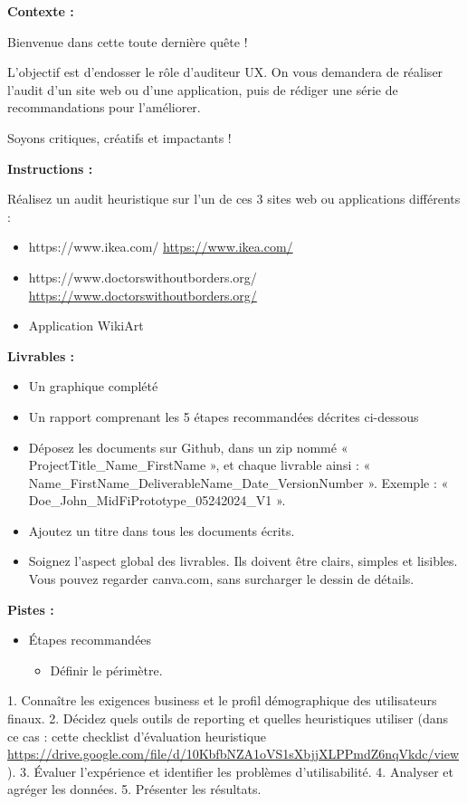 \makeheaderfiles

\textbf{Contexte :}

Bienvenue dans cette toute dernière quête !

L'objectif est d'endosser le rôle d'auditeur UX. On vous demandera de réaliser l'audit d'un site web ou d'une application, puis de rédiger une série de recommandations pour l'améliorer.

Soyons critiques, créatifs et impactants !

\textbf{Instructions :}

Réalisez un audit heuristique sur l'un de ces 3 sites web ou applications différents :

\begin{itemize}
\item https://www.ikea.com/ \url{https://www.ikea.com/}
\item https://www.doctorswithoutborders.org/ \url{https://www.doctorswithoutborders.org/}
\item Application WikiArt
\end{itemize}

\textbf{Livrables :}

\begin{itemize}
\item Un graphique complété
\item Un rapport comprenant les 5 étapes recommandées décrites ci-dessous
\item Déposez les documents sur Github, dans un zip nommé « ProjectTitle\_Name\_FirstName », et chaque livrable ainsi : « Name\_FirstName\_DeliverableName\_Date\_VersionNumber ». Exemple : « Doe\_John\_MidFiPrototype\_05242024\_V1 ».
\item Ajoutez un titre dans tous les documents écrits.
\item Soignez l'aspect global des livrables. Ils doivent être clairs, simples et lisibles. Vous pouvez regarder canva.com, sans surcharger le dessin de détails.
\end{itemize}

\textbf{Pistes :}

\begin{itemize}
\item Étapes recommandées
\begin{itemize}
\item Définir le périmètre.
\end{itemize}
\end{itemize}
1. Connaître les exigences business et le profil démographique des utilisateurs finaux.
2. Décidez quels outils de reporting et quelles heuristiques utiliser (dans ce cas : cette checklist d'évaluation heuristique \url{https://drive.google.com/file/d/10KbfbNZA1oVS1sXbjjXLPPmdZ6nqVkdc/view}).
3. Évaluer l'expérience et identifier les problèmes d'utilisabilité.
4. Analyser et agréger les données.
5. Présenter les résultats.

